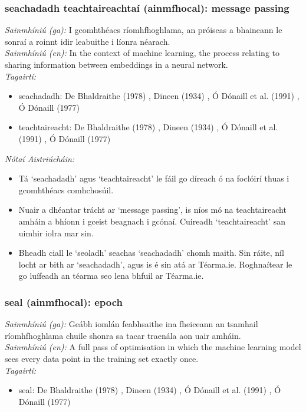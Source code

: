 \documentclass{article}
\begin{document}
\subsubsection*{seachadadh teachtaireachtaí (ainmfhocal): message passing}
 \noindent \textit{Sainmhíniú (ga):} I gcomhthéacs ríomhfhoghlama, an próiseas a bhaineann le sonraí a roinnt idir leabuithe i líonra néarach.
\\
 \noindent \textit{Sainmhíniú (en):} In the context of machine learning, the process relating to sharing information between embeddings in a neural network.
\\
 \noindent \textit{Tagairtí:}
\begin{itemize}
	\item seachadadh: De Bhaldraithe (1978) \cite{de-bhaldraithe}, Dineen (1934) \cite{dineen}, Ó Dónaill et al. (1991) \cite{focloir-beag}, Ó Dónaill (1977) \cite{odonaill}
	\item teachtaireacht: De Bhaldraithe (1978) \cite{de-bhaldraithe}, Dineen (1934) \cite{dineen}, Ó Dónaill et al. (1991) \cite{focloir-beag}, Ó Dónaill (1977) \cite{odonaill}
\end{itemize}

 \noindent \textit{Nótaí Aistriúcháin:}
\begin{itemize}
	\item Tá `seachadadh' agus `teachtaireacht' le fáil go díreach ó na foclóirí thuas i gcomhthéacs comhchosúil.
	\item Nuair a dhéantar trácht ar `message passing', is níos mó na teachtaireacht amháin a bhíonn i gceist beagnach i gcónaí. Cuireadh `teachtaireacht' san uimhir iolra mar sin.
	\item Bheadh ciall le `seoladh' seachas `seachadadh' chomh maith. Sin ráite, níl locht ar bith ar `seachadadh', agus is é sin atá ar Téarma.ie. Roghnaítear le go luífeadh an téarma seo lena bhfuil ar Téarma.ie.
\end{itemize}


\subsubsection*{seal (ainmfhocal): epoch}
 \noindent \textit{Sainmhíniú (ga):}  Geábh iomlán feabhsaithe ina fheiceann an tsamhail ríomhfhoghlama chuile shonra sa tacar traenála aon uair amháin.
\\
 \noindent \textit{Sainmhíniú (en):} A full pass of optimisation in which the machine learning model sees every data point in the training set exactly once.
\\
 \noindent \textit{Tagairtí:}
\begin{itemize}
	\item seal: De Bhaldraithe (1978) \cite{de-bhaldraithe}, Dineen (1934) \cite{dineen}, Ó Dónaill et al. (1991) \cite{focloir-beag}, Ó Dónaill (1977) \cite{odonaill}
\end{itemize}
\end{document}
